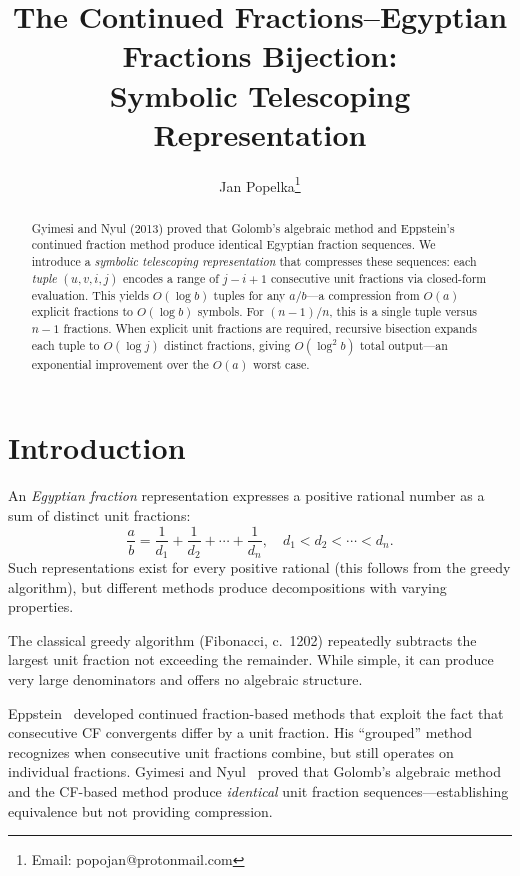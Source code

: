 \documentclass[11pt]{article}
\title{The Continued Fractions--Egyptian Fractions Bijection:\\Symbolic Telescoping Representation}
\author{Jan Popelka\thanks{Email: popojan@protonmail.com}}
\date{}
\theoremstyle{definition}
\theoremstyle{remark}
\begin{document}
\maketitle

\begin{abstract}
Gyimesi and Nyul (2013) proved that Golomb's algebraic method and
Eppstein's continued fraction method produce identical Egyptian fraction
sequences. We introduce a \emph{symbolic telescoping representation}
that compresses these sequences: each \emph{tuple} $(u,v,i,j)$ encodes
a range of $j-i+1$ consecutive unit fractions via closed-form evaluation.
This yields $O(\log b)$ tuples for any $a/b$---a compression from $O(a)$
explicit fractions to $O(\log b)$ symbols. For $(n-1)/n$, this is a single
tuple versus $n-1$ fractions.
When explicit unit fractions are required, recursive bisection expands
each tuple to $O(\log j)$ distinct fractions, giving $O(\log^2 b)$ total
output---an exponential improvement over the $O(a)$ worst case.
\end{abstract}

\section{Introduction}

An \emph{Egyptian fraction} representation expresses a positive rational number
as a sum of distinct unit fractions:
\begin{equation}
\frac{a}{b} = \frac{1}{d_1} + \frac{1}{d_2} + \cdots + \frac{1}{d_n}, \quad d_1 < d_2 < \cdots < d_n.
\end{equation}
Such representations exist for every positive rational (this follows from the greedy
algorithm), but different methods produce decompositions with varying properties.

The classical greedy algorithm (Fibonacci, c.~1202) repeatedly subtracts the largest
unit fraction not exceeding the remainder. While simple, it can produce very large
denominators and offers no algebraic structure.

Eppstein~\cite{eppstein} developed continued fraction-based methods that exploit
the fact that consecutive CF convergents differ by a unit fraction. His ``grouped''
method recognizes when consecutive unit fractions combine, but still operates on
individual fractions. Gyimesi and Nyul~\cite{gyimesi} proved that Golomb's
algebraic method and the CF-based method produce \emph{identical} unit fraction
sequences---establishing equivalence but not providing compression.
\end{document}

